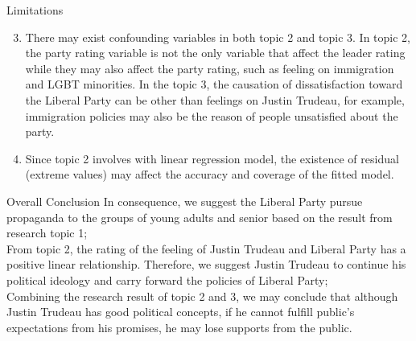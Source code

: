 \documentclass[
  ignorenonframetext,
]{beamer}
\providecommand{\tightlist}{%
  \setlength{\itemsep}{0pt}\setlength{\parskip}{0pt}}
\begin{document}
\begin{frame}{Limitations}
\protect\hypertarget{limitations-1}{}
\begin{enumerate}
\setcounter{enumi}{2}
\tightlist
\item
  There may exist confounding variables in both topic 2 and topic 3. In
  topic 2, the party rating variable is not the only variable that
  affect the leader rating while they may also affect the party rating,
  such as feeling on immigration and LGBT minorities. In the topic 3,
  the causation of dissatisfaction toward the Liberal Party can be other
  than feelings on Justin Trudeau, for example, immigration policies may
  also be the reason of people unsatisfied about the party.\\
\item
  Since topic 2 involves with linear regression model, the existence of
  residual (extreme values) may affect the accuracy and coverage of the
  fitted model.\\
\end{enumerate}
\end{frame}

\begin{frame}{Overall Conclusion}
\protect\hypertarget{overall-conclusion}{}
In consequence, we suggest the Liberal Party pursue propaganda to the
groups of young adults and senior based on the result from research
topic 1;\\
From topic 2, the rating of the feeling of Justin Trudeau and Liberal
Party has a positive linear relationship. Therefore, we suggest Justin
Trudeau to continue his political ideology and carry forward the
policies of Liberal Party;\\
Combining the research result of topic 2 and 3, we may conclude that
although Justin Trudeau has good political concepts, if he cannot
fulfill public's expectations from his promises, he may lose supports
from the public.
\end{frame}
\end{document}
